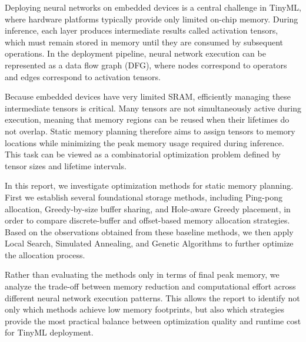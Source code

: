 
\singlespacing                        %


Deploying neural networks on embedded devices is a central challenge in TinyML, where hardware platforms typically provide only limited on-chip memory. During inference, each layer produces intermediate results called activation tensors, which must remain stored in memory until they are consumed by subsequent operations. In the deployment pipeline, neural network execution can be represented as a data flow graph (DFG), where nodes correspond to operators and edges correspond to activation tensors.

Because embedded devices have very limited SRAM, efficiently managing these intermediate tensors is critical. Many tensors are not simultaneously active during execution, meaning that memory regions can be reused when their lifetimes do not overlap. Static memory planning therefore aims to assign tensors to memory locations while minimizing the peak memory usage required during inference. This task can be viewed as a combinatorial optimization problem defined by tensor sizes and lifetime intervals.

In this report, we investigate optimization methods for static memory planning. First we establish several foundational storage methods, including Ping-pong allocation, Greedy-by-size buffer sharing, and Hole-aware Greedy placement, in order to compare discrete-buffer and offset-based memory allocation strategies. Based on the observations obtained from these baseline methods, we then apply Local Search, Simulated Annealing, and Genetic Algorithms to further optimize the allocation process.

Rather than evaluating the methods only in terms of final peak memory, we analyze the trade-off between memory reduction and computational effort across different neural network execution patterns. This allows the report to identify not only which methods achieve low memory footprints, but also which strategies provide the most practical balance between optimization quality and runtime cost for TinyML deployment.